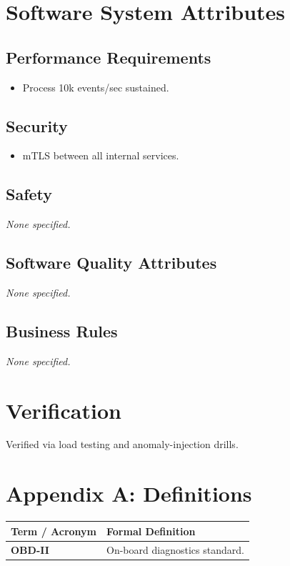 \documentclass[11pt,a4paper]{article}
\begin{document}
\section{Software System Attributes}
\subsection{Performance Requirements}
\begin{itemize}[leftmargin=*]
    \item Process 10k events/sec sustained.
\end{itemize}

\subsection{Security}
\begin{itemize}[leftmargin=*]
    \item mTLS between all internal services.
\end{itemize}

\subsection{Safety}
\textit{None specified.}\par\vspace{6pt}
\subsection{Software Quality Attributes}
\textit{None specified.}\par\vspace{6pt}
\subsection{Business Rules}
\textit{None specified.}\par\vspace{6pt}
\section{Verification}
Verified via load testing and anomaly-injection drills.

\section{Appendix A: Definitions}
\begin{table}[h!]
\centering
\begin{tabularx}{\linewidth}{l X}
\toprule
\textbf{Term / Acronym} & \textbf{Formal Definition} \\
\midrule
\textbf{OBD-II} & On-board diagnostics standard. \\
\bottomrule
\end{tabularx}
\end{table}
\end{document}
